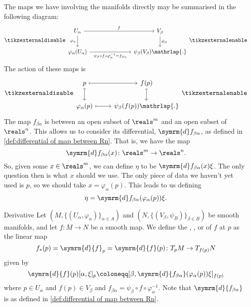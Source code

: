\documentclass[fleqn]{NotesClass}
\renewcommand{\dl}{\symrm{d}}
\begin{document}
    The maps we have involving the manifolds directly may be summarised in the following diagram:
    \begin{equation}
        \tikzexternaldisable
        \begin{tikzcd}[column sep=2.5cm]
            U_\alpha \arrow[r, "f"] \arrow[d, "\varphi_\alpha"'] & V_\beta \arrow[d, "\psi_\beta"]\\
            \varphi_\alpha(U_\alpha) \arrow[r, "\psi_\beta \circ f \circ \varphi_\alpha^{-1} = f_{\beta\alpha}"'] & \psi_\beta(V_\beta)\mathrlap{.}
        \end{tikzcd}
        \tikzexternalenable
    \end{equation}
    The action of these maps is
    \begin{equation}
        \tikzexternaldisable
        \begin{tikzcd}
            p \arrow[r, mapsto] \arrow[d, mapsto] & f(p) \arrow[d, mapsto]\\
            \varphi_\alpha(p) \arrow[r, mapsto] & \psi_\beta(f(p))\mathrlap{.}
        \end{tikzcd}
        \tikzexternalenable
    \end{equation}
    The map \(f_{\beta\alpha}\) is between an open subset of \(\reals^m\) and an open subset of \(\reals^n\).
    This allows us to consider its differential, \(\dl f_{\beta\alpha}\), as defined in \cref{def:differential of map between Rn}.
    That is, we have the map
    \begin{equation}
        \dl f_{\beta\alpha}(x) \colon \reals^m \to \reals^n.
    \end{equation}
    So, given some \(x \in \reals^m\), we can define \(\eta\) to be \(\dl f_{\beta\alpha}(x)\xi\).
    The only question then is what \(x\) should we use.
    The only piece of data we haven't yet used is \(p\), so we should take \(x = \varphi_\alpha(p)\).
    This leads to us defining
    \begin{equation}
        \eta = \dl f_{\beta\alpha}(\varphi_\alpha(p))\xi.
    \end{equation}
    
    \begin{dfn}{Derivative}{}
        Let \((M, \{(U_\alpha, \varphi_\alpha)\}_{\alpha \in A})\) and \((N, \{(V_\beta, \psi_B	)\}_{\beta \in B})\) be smooth manifolds, and let \(f \colon M \to N\) be a smooth map.
        We define the , , or  of \(f\) at \(p\) as the linear map
        \begin{equation}
            f_*(p) = \dl{f}_p = \dl{f}(p) \colon T_pM \to T_{f(p)}N 
        \end{equation}
        given by
        \begin{equation}
            \dl{f}(p)[\alpha, \xi]_p \coloneqq [\beta, \dl{f_{\beta\alpha}}(\varphi_\alpha(p))\xi]_{f(p)}
        \end{equation}
        where \(p \in U_\alpha\) and \(f(p) \in V_\beta\) and \(f_{\beta\alpha} = \psi_\beta \circ f \circ \varphi_\alpha^{-1}\).
        Note that \(\dl{f_{\beta\alpha}}\) is as defined in \cref{def:differential of map between Rn}.
    \end{dfn}
    

%        
%
\end{document}
